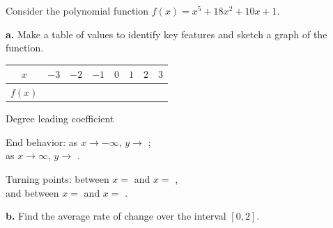 \newpage
{}
Consider the polynomial function $f(x)=x^5+18x^2+10x+1$.

\textbf{a.} Make a table of values to identify key features and sketch a graph of the function.

\begin{minipage}[t]{0.5\textwidth}
\vspace{0pt}
{\small
\begin{tabular}{|c|c|c|c|c|c|c|c|}
\hline
$x$ & $-3$ & $-2$ & $-1$ & $0$ & $1$ & $2$ & $3$ \\ \hline
$f(x)$ & \rule{0pt}{18pt}\hspace{0.66cm} & \hspace{0.66cm} & \hspace{0.66cm} & \hspace{0.66cm} & \hspace{0.66cm} & \hspace{0.66cm} & \hspace{0.66cm} \\ \hline
\end{tabular}}

\vspace{8pt}
Degree \blank[1cm] \quad leading coefficient \blank[1cm]

\vspace{6pt}
End behavior: as $x\to-\infty$, $y\to$ \blank[1.3cm];\\[4pt]
as $x\to\infty$, $y\to$ \blank[1.3cm].

\vspace{6pt}
Turning points: between $x=$ \blank[1cm] and $x=$ \blank[1cm],\\[4pt]
and between $x=$ \blank[1cm] and $x=$ \blank[1cm].

\vspace{6pt}
\textbf{b.} Find the average rate of change over the interval $[0,2]$.
\lines[2]
\end{minipage}\hfill
\begin{minipage}[t]{0.46\textwidth}
\vspace{0pt}
\centering
{}
\end{minipage}

